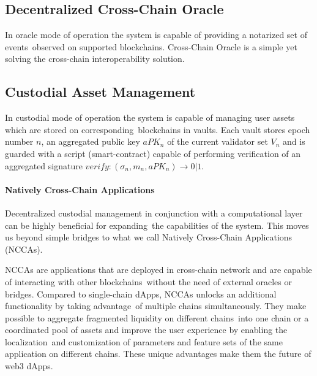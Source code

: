 \subsection{Decentralized Cross-Chain Oracle}\label{subsec:cross-chain-oracle}

In oracle mode of operation the system is capable of providing a notarized set of events\
observed on supported blockchains.
Cross-Chain Oracle is a simple yet solving the cross-chain interoperability solution.

\subsection{Custodial Asset Management}\label{subsec:custodial-asset-management}

In custodial mode of operation the system is capable of managing user assets which are stored on corresponding\
blockchains in vaults.
Each vault stores epoch number $n$, an aggregated public key $aPK_n$ of the current validator set $V_n$ and
is guarded with a script (smart-contract) capable of performing verification of
an aggregated signature ${verify: (\sigma_n, m_n, aPK_n) \rightarrow 0 | 1}$.

\paragraph{Natively Cross-Chain Applications}

Decentralized custodial management in conjunction with a computational layer can be highly beneficial for expanding\
the capabilities of the system.
This moves us beyond simple bridges to what we call Natively Cross-Chain Applications (NCCAs).

NCCAs are applications that are deployed in cross-chain network and are capable of interacting with other blockchains\
without the need of external oracles or bridges.
Compared to single-chain dApps, NCCAs unlocks an additional functionality by taking advantage\
of multiple chains simultaneously.
They make possible to aggregate fragmented liquidity on different chains\
into one chain or a coordinated pool of assets and improve the user experience by enabling the localization\
and customization of parameters and feature sets of the same application on different chains.
These unique advantages make them the future of web3 dApps.
